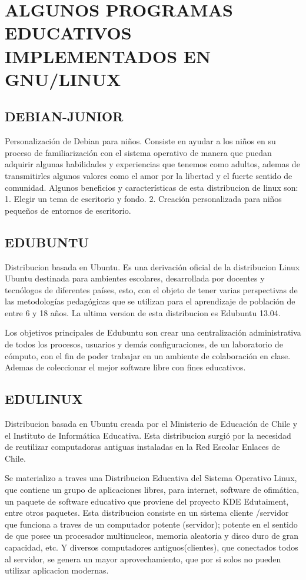 \section*{ALGUNOS PROGRAMAS EDUCATIVOS IMPLEMENTADOS EN GNU/LINUX}
\subsection*{DEBIAN-JUNIOR}
Personalización de Debian para niños.
Consiste en ayudar a los niños en su proceso de familiarización
con el sistema operativo de manera que puedan adquirir algunas
habilidades y experiencias que tenemos como adultos, ademas
de transmitirles algunos valores como el amor por la libertad y
el fuerte sentido de comunidad.
Algunos beneficios y características de esta distribucion de linux
son:
1. Elegir un tema de escritorio y fondo.
2. Creación personalizada para niños pequeños de entornos de
escritorio.
\subsection*{EDUBUNTU}
Distribucion basada en Ubuntu.
Es una derivación oficial de la distribucion Linux Ubuntu
destinada para ambientes escolares, desarrollada por docentes y
tecnólogos de diferentes países, esto, con el objeto de tener
varias perspectivas de las metodologías pedagógicas que se
utilizan para el aprendizaje de población de entre 6 y 18 años.
La ultima version de esta distribucion es Edubuntu 13.04.

Los objetivos principales de Edubuntu son crear una
centralización administrativa de todos los procesos, usuarios y
demás configuraciones, de un laboratorio de cómputo, con el fin
de poder trabajar en un ambiente de colaboración en clase.
Ademas de coleccionar el mejor software libre con fines
educativos.

\subsection*{EDULINUX}
Distribucion basada en Ubuntu creada por el
Ministerio de Educación de Chile y el Instituto de Informática
Educativa.
Esta distribucion surgió por la necesidad de reutilizar
computadoras antiguas instaladas en la Red Escolar Enlaces de
Chile.

Se materializo a traves una Distribucion Educativa del Sistema
Operativo Linux, que contiene un grupo de aplicaciones libres,
para internet, software de ofimática, un paquete de software
educativo que proviene del proyecto KDE Edutaiment, entre
otros paquetes. Esta distribucion consiste en un sistema
cliente /servidor que funciona a traves de un computador
potente (servidor); potente en el sentido de que posee un
procesador multinucleos, memoria aleatoria y disco duro de
gran capacidad, etc. Y diversos computadores antiguos(clientes),
que conectados todos al servidor, se genera un mayor
aprovechamiento, que por si solos no pueden utilizar aplicacion
modernas.

